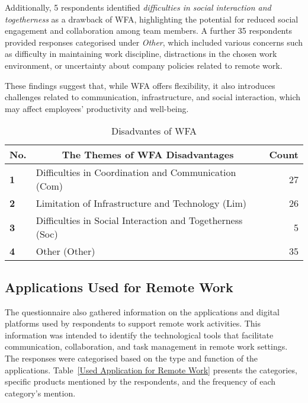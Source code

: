 \documentclass[a4paper, conference]{IEEEtran}
\begin{document}
Additionally, 5 respondents identified \textit{difficulties in social interaction and togetherness} as a drawback of WFA, highlighting the potential for reduced social engagement and collaboration among team members. A further 35 respondents provided responses categorised under \textit{Other}, which included various concerns such as difficulty in maintaining work discipline, distractions in the chosen work environment, or uncertainty about company policies related to remote work.

These findings suggest that, while WFA offers flexibility, it also introduces challenges related to communication, infrastructure, and social interaction, which may affect employees' productivity and well-being.


\begin{table}
	\centering
	\caption{Disadvantes of WFA}
	\label{Disadvantages of WFA}
	\begin{tabular}{|p{}|p{}|r|}
		\hline
		\multicolumn{1}{|c|}{\textbf{No.}} & \multicolumn{1}{c|}{\textbf{The Themes of WFA Disadvantages}} & \multicolumn{1}{c|}{\textbf{Count}} \\ \hline
		\textbf{1}                 & Difficulties in Coordination and Communication (Com)   & 27 %
		\\ \hline
		\textbf{2}                 & Limitation of Infrastructure and Technology (Lim)    & 26 %
		\\ \hline
		\textbf{3}                 & Difficulties in Social Interaction and Togetherness (Soc) & 5 %
		\\ \hline
		\textbf{4}                 & Other (Other) & 35 %
		\\ \hline
	\end{tabular}
\end{table}

\subsection{Applications Used for Remote Work}
\label{sec:used-applications}

The questionnaire also gathered information on the applications and digital platforms used by respondents to support remote work activities. This information was intended to identify the technological tools that facilitate communication, collaboration, and task management in remote work settings. The responses were categorised based on the type and function of the applications. Table~\ref{Used Application for Remote Work} presents the categories, specific products mentioned by the respondents, and the frequency of each category's mention.
\end{document}

